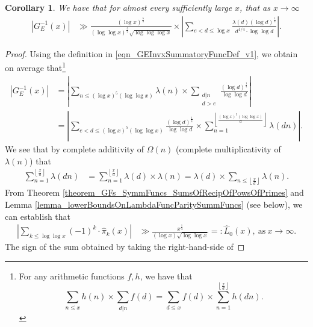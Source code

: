 \documentclass[11pt,reqno,a4letter]{article}
\numberwithin{figure}{section}
\numberwithin{table}{section}
\newcommand{\cf}{\textit{cf.\ }}
\newcommand{\Floor}[2]{\ensuremath{\left\lfloor \frac{#1}{#2} \right\rfloor}}
\theoremstyle{plain}
\newtheorem{cor}[theorem]{Corollary}
\numberwithin{theorem}{section}
\theoremstyle{definition}
\newcommand{\NBRef}[1]{}
\begin{document}
\begin{cor} 
\label{cor_ASemiForm_ForGInvx_v1} 
We have that for almost every sufficiently large $x$, that as $x \rightarrow \infty$ 
\begin{align*} 
\left\lvert G_E^{-1}(x) \right\rvert & \gg 
     \frac{(\log x)^{\frac{5}{4}}}{ 
     (\log\log x)^{\frac{3}{4}} \sqrt{\log\log\log x}} \times 
     \left\lvert \sum_{e < d \leq \log x} 
     \frac{\lambda(d) (\log d)^{\frac{1}{4}}}{d^{1/4} \cdot \log\log d} 
     \right\rvert. 
\end{align*} 
\end{cor} 
\NBRef{A10-2020.04-26} 
\begin{proof} 
Using the definition in \eqref{eqn_GEInvxSummatoryFuncDef_v1}, we obtain on average that\footnote{ 
     For any arithmetic functions $f,h$, we have that \cite[\cf \S 3.10; \S 3.12]{APOSTOLANUMT} 
     \[
     \sum_{n \leq x} h(n) \times \sum_{d|n} f(d) = \sum_{d \leq x} f(d) \times \sum_{n=1}^{\Floor{x}{d}} h(dn). 
     \] 
}
\begin{align*} 
\left\lvert G_E^{-1}(x) \right\rvert & = 
     \left\lvert \sum_{n \leq (\log x)^{5} (\log\log x)} \lambda(n) \times 
     \sum_{\substack{d|n \\ d > e}} \frac{(\log d)^{\frac{1}{4}}}{\log\log d} \right\rvert \\ 
     & = \left\lvert \sum_{e < d \leq (\log x)^{5} (\log\log x)} 
     \frac{(\log d)^{\frac{1}{4}}}{\log\log d} \times 
     \sum_{n=1}^{\Floor{(\log x)^{5} (\log\log x)}{d}} \lambda(dn) \right\rvert. 
\end{align*} 
We see that by complete additivity of $\Omega(n)$ 
(complete multiplicativity of $\lambda(n)$) that 
\begin{align*} 
\sum_{n=1}^{\Floor{x}{d}} \lambda(dn) & = \sum_{n=1}^{\Floor{x}{d}} \lambda(d) \times \lambda(n) 
     = \lambda(d) \times \sum_{n \leq \Floor{x}{d}} \lambda(n). 
\end{align*} 
From Theorem \ref{theorem_GFs_SymmFuncs_SumsOfRecipOfPowsOfPrimes} and 
Lemma \ref{lemma_lowerBoundsOnLambdaFuncParitySummFuncs} (see below), 
we can establish that 
\begin{align} 
\label{eqn_proof_tag_GEInvxLowerBound_v1} 
\left\lvert \sum_{k \leq \log\log x} (-1)^k \cdot \widehat{\pi}_k(x) \right\rvert 
     & \gg 
     \frac{x^{\frac{1}{4}}}{(\log x) \sqrt{\log\log x}} 
     =: \widehat{L}_0(x), \mathrm{\ as\ } x \rightarrow \infty. 
\end{align} 
The sign of the sum obtained by taking the right-hand-side of 

\end{proof}
\end{document}
